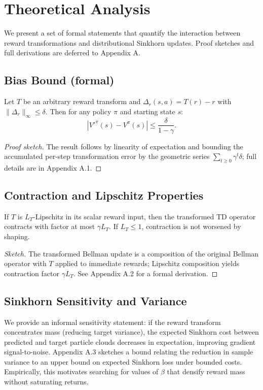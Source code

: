 \documentclass{article}
\begin{document}
\section{Theoretical Analysis}
We present a set of formal statements that quantify the interaction between reward transformations and distributional Sinkhorn updates. Proof sketches and full derivations are deferred to Appendix A.

\subsection{Bias Bound (formal)}
\begin{lemma}
Let $T$ be an arbitrary reward transform and $\Delta_r(s,a)=T(r)-r$ with $\|\Delta_r\|_\infty\le\delta$. Then for any policy $\pi$ and starting state $s$:
\begin{equation}
|V'^\pi(s)-V^\pi(s)| \le \frac{\delta}{1-\gamma}.
\end{equation}
\end{lemma}
\begin{proof}[Proof sketch]
The result follows by linearity of expectation and bounding the accumulated per-step transformation error by the geometric series $\sum_{t\ge0}\gamma^t\delta$; full details are in Appendix A.1.
\end{proof}

\subsection{Contraction and Lipschitz Properties}
\begin{lemma}
If $T$ is $L_T$-Lipschitz in its scalar reward input, then the transformed TD operator contracts with factor at most $\gamma L_T$. If $L_T\le 1$, contraction is not worsened by shaping.
\end{lemma}
\begin{proof}[Sketch]
The transformed Bellman update is a composition of the original Bellman operator with $T$ applied to immediate rewards; Lipschitz composition yields contraction factor $\gamma L_T$. See Appendix A.2 for a formal derivation.
\end{proof}

\subsection{Sinkhorn Sensitivity and Variance}
We provide an informal sensitivity statement: if the reward transform concentrates mass (reducing target variance), the expected Sinkhorn cost between predicted and target particle clouds decreases in expectation, improving gradient signal-to-noise. Appendix A.3 sketches a bound relating the reduction in sample variance to an upper bound on expected Sinkhorn loss under bounded costs. Empirically, this motivates searching for values of $\beta$ that densify reward mass without saturating returns.
\end{document}
